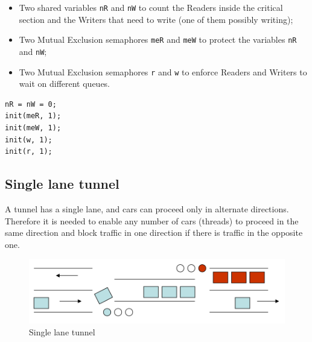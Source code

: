 \begin{itemize}
\item Two shared variables \texttt{nR} and \texttt{nW} to count the Readers inside the critical section and the Writers that need to write (one of them possibly writing);
\item Two Mutual Exclusion semaphores \texttt{meR} and \texttt{meW} to protect the variables \texttt{nR} and \texttt{nW};
\item Two Mutual Exclusion semaphores \texttt{r} and \texttt{w} to enforce Readers and Writers to wait on different queues.
\end{itemize}

\begin{verbatim}
nR = nW = 0;
init(meR, 1);
init(meW, 1);
init(w, 1);
init(r, 1);
\end{verbatim}

\begin{Parallel}{}{}
\end{Parallel}

\subsection{Single lane tunnel}
A tunnel has a single lane, and cars can proceed only in alternate directions. Therefore it is needed to enable any number of cars (threads) to proceed in the same direction and block traffic in one direction if there is traffic in the opposite one.

\begin{figure}[hbtp]
\centering
\includegraphics[scale=0.4]{images/synchronization/single_lane_tunnel.png}
\caption{Single lane tunnel}
\end{figure}

